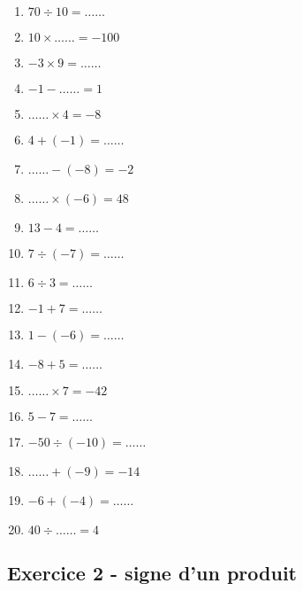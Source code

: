 \begin{multicols}{3}\noindent
    \begin{enumerate}
        \item $70 \div 10 = \ldots\ldots$
        \item $10 \times \ldots\ldots = -100$
        \item $-3 \times 9 = \ldots\ldots$
        \item $-1 - \ldots\ldots = 1$
        \item $\ldots\ldots \times 4 = -8$
        \item $4 + \left( -1\right) = \ldots\ldots$
        \item $\ldots\ldots - \left( -8\right) = -2$
        \item $\ldots\ldots \times \left( -6\right) = 48$
        \item $13 - 4 = \ldots\ldots$
        \item $7 \div \left( -7\right) = \ldots\ldots$
        \item $6 \div 3 = \ldots\ldots$
        \item $-1 + 7 = \ldots\ldots$
        \item $1 - \left( -6\right) = \ldots\ldots$
        \item $-8 + 5 = \ldots\ldots$
        \item $\ldots\ldots \times 7 = -42$
        \item $5 - 7 = \ldots\ldots$
        \item $-50 \div \left( -10\right) = \ldots\ldots$
        \item $\ldots\ldots + \left( -9\right) = -14$
        \item $-6 + \left( -4\right) = \ldots\ldots$
        \item $40 \div \ldots\ldots = 4$
    \end{enumerate}
  \end{multicols}

\subsection*{Exercice 2 - signe d'un produit}

